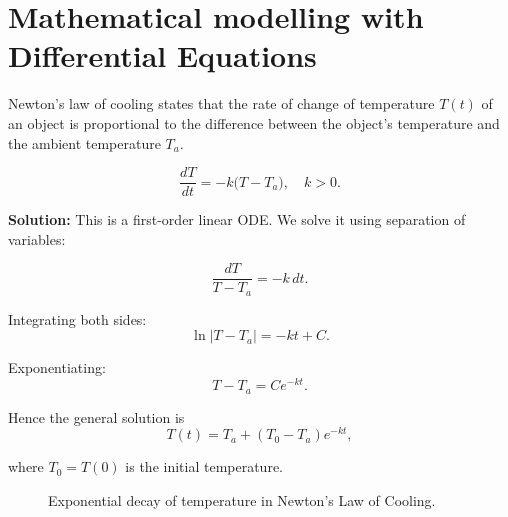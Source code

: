 \section{Mathematical modelling with Differential Equations}
\begin{example}
Newton's law of cooling states that the rate of change of temperature $T(t)$ of an object is proportional to the difference between the object’s temperature and the ambient temperature $T_a$.  

\[
\frac{dT}{dt} = -k \big(T - T_a\big), \quad k > 0.
\]

\textbf{Solution:}  
This is a first-order linear ODE. We solve it using separation of variables:

\[
\frac{dT}{T - T_a} = -k \, dt.
\]

Integrating both sides:
\[
\ln|T - T_a| = -kt + C.
\]

Exponentiating:
\[
T - T_a = Ce^{-kt}.
\]

Hence the general solution is
\[
T(t) = T_a + (T_0 - T_a)e^{-kt},
\]

where $T_0 = T(0)$ is the initial temperature.
\end{example}

\begin{figure}[h]
\centering
{}
\caption{Exponential decay of temperature in Newton’s Law of Cooling.}
\end{figure}

